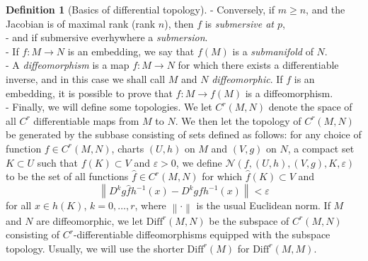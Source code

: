\documentclass[11pt, a4paper]{memoir}
\theoremstyle{plain}
\theoremstyle{definition}
\newtheorem{defn}{Definition}
\newcommand{\norm}[1]{\left\lVert#1\right\rVert}
\begin{document}
\begin{defn}[Basics of differential topology]
- Conversely, if $m\geq n$, and the Jacobian is of maximal rank (rank $n$), then $f$ is \emph{submersive at $p$},\\
- and if submersive everhywhere a \emph{submersion}.\\
- If $f: M\to N$ is an embedding, we say that $f(M)$ is a \emph{submanifold} of $N$.\\
- A \emph{diffeomorphism} is a map $f:M\to N$ for which there exists a differentiable inverse, and in this case we shall call $M$ and $N$ \emph{diffeomorphic}. If $f$ is an embedding, it is possible to prove that $f:M\to f(M)$ is a diffeomorphism.\\
- Finally, we will define some topologies. We let $C^r(M,N)$ denote the space of all $C^r$ differentiable maps from $M$ to $N$. We then let the topology of $C^r(M,N)$ be generated by the subbase consisting of sets defined as follows: for any choice of function $f\in C^r(M,N)$, charts $(U,h)$ on $M$ and $(V,g)$ on $N$, a compact set $K\subset U$ such that $f(K)\subset V$ and $\varepsilon>0$, we define $\mathcal{N}(f,(U,h),(V,g),K,\varepsilon)$ to be the set of all functions $\hat{f}\in C^r(M,N)$ for which $\hat{f}(K)\subset V$ and
$$\norm{D^kg\hat{f}h^{-1}(x)-D^kgfh^{-1}(x)}<\varepsilon$$
for all $x\in h(K)$, $k=0,\ldots,r$, where $\norm{\cdot}$ is the usual Euclidean norm. If $M$ and $N$ are diffeomorphic, we let $\text{Diff}^r(M,N)$ be the subspace of $C^r(M,N)$ consisting of $C^r$-differentiable diffeomorphisms equipped with the subspace topology. Usually, we will use the shorter $\text{Diff}^r(M)$ for $\text{Diff}^r(M,M)$.
\end{defn}
\end{document}
